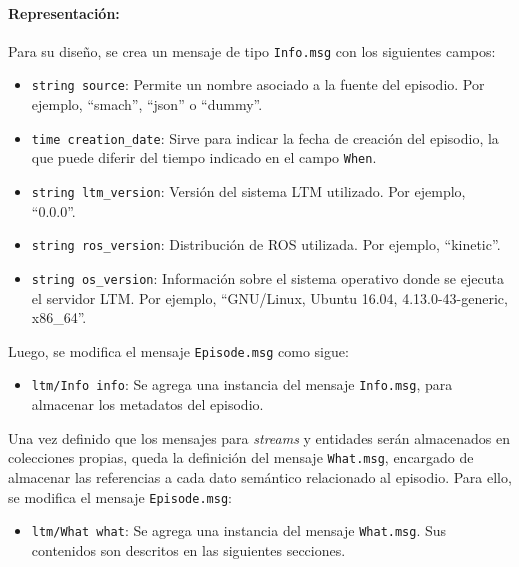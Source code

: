 \paragraph{Representación:}
Para su diseño, se crea un mensaje de tipo \texttt{Info.msg} con los siguientes campos:
\begin{itemize}
	\item \texttt{string source}: Permite un nombre asociado a la fuente del episodio. Por ejemplo, ``smach'', ``json'' o ``dummy''.
	\item \texttt{time creation\_date}: Sirve para indicar la fecha de creación del episodio, la que puede diferir del tiempo indicado en el campo \texttt{When}.
	\item \texttt{string ltm\_version}: Versión del sistema LTM utilizado. Por ejemplo, ``0.0.0''.
	\item \texttt{string ros\_version}: Distribución de ROS utilizada. Por ejemplo, ``kinetic''.
	\item \texttt{string os\_version}: Información sobre el sistema operativo donde se ejecuta el servidor LTM. Por ejemplo, ``GNU/Linux, Ubuntu 16.04, 4.13.0-43-generic, x86\_64''.
\end{itemize}

Luego, se modifica el mensaje \texttt{Episode.msg} como sigue:
\begin{itemize}
	\item \texttt{ltm/Info info}: Se agrega una instancia del mensaje \texttt{Info.msg}, para almacenar los metadatos del episodio.
\end{itemize}

Una vez definido que los mensajes para \textit{streams} y entidades serán almacenados en colecciones propias, queda la definición del mensaje \texttt{What.msg}, encargado de almacenar las referencias a cada dato semántico relacionado al episodio. Para ello, se modifica el mensaje \texttt{Episode.msg}:
\begin{itemize}
	\item \texttt{ltm/What what}: Se agrega una instancia del mensaje \texttt{What.msg}. Sus contenidos son descritos en las siguientes secciones.
\end{itemize}

